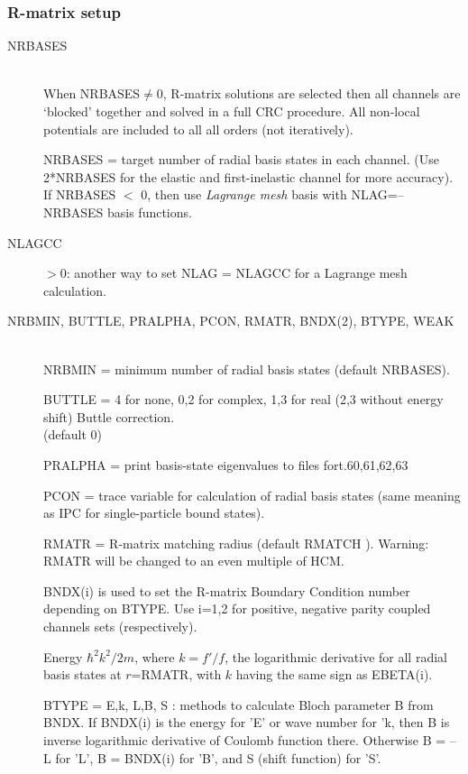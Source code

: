 \documentclass[11pt]{article}
\begin{document}
\subsubsection{R-matrix setup}
\begin{description}

\item[NRBASES] ~\\
When NRBASES$\neq$0, R-matrix solutions are selected then all channels
are `blocked' together and solved in a full CRC procedure. All non-local potentials are included to all all orders (not iteratively).

NRBASES = target number of radial basis states in each channel.
(Use 2*NRBASES for the elastic and first-inelastic channel for more accuracy).\\
If NRBASES $<$ 0, then use {\em Lagrange mesh} basis with NLAG=--NRBASES basis functions.

\item[NLAGCC] $>0$: another way to set NLAG = NLAGCC for a Lagrange mesh calculation.

\item[NRBMIN, BUTTLE, PRALPHA, PCON, RMATR, BNDX(2), BTYPE, WEAK] ~\\
NRBMIN = minimum number of radial basis states (default NRBASES).

BUTTLE = 4 for none, 0,2 for complex, 1,3 for real
(2,3 without energy shift) Buttle correction.\\
(default 0)

PRALPHA = print basis-state eigenvalues to files fort.60,61,62,63

PCON = trace variable for calculation of radial basis states (same
meaning as IPC for single-particle bound states).


RMATR = R-matrix matching radius (default RMATCH ).
Warning: RMATR will be changed to an even multiple of HCM.

BNDX(i) is used to set the R-matrix Boundary Condition number depending on BTYPE.
Use i=1,2 for positive, negative parity coupled channels sets (respectively).

Energy $\hbar^2k^2/2m$, where $k= f'/f$, the logarithmic derivative
for all radial basis states at $r$=RMATR, with $k$ having the same
sign as EBETA(i). 

BTYPE = E,k, L,B, S : methods to calculate Bloch parameter B from BNDX.
If BNDX(i)  is the energy for 'E' or  wave number for 'k, then B is inverse logarithmic derivative of Coulomb function there. Otherwise B = --L for 'L', B = BNDX(i) for 'B', and S (shift function) for 'S'.


\end{description}
\end{document}
